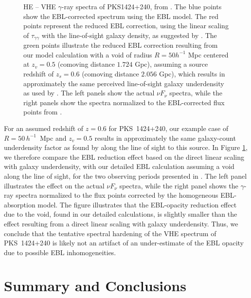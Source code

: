 \documentclass{aastex6}
\begin{document}
\begin{figure}[ht]
\caption{HE -- VHE $\gamma$-ray spectra of PKS1424+240, from \cite{Archambault14}. The blue points
show the EBL-corrected spectrum using the \cite{Gilmore12} EBL model. The red points represent the reduced
EBL correction, using the linear scaling of $\tau_{\gamma\gamma}$ with the line-of-sight galaxy density,
as suggested by \cite{Furniss15}. The green points illustrate the reduced EBL correction resulting from
our model calculation with a void of radius $R = 50h^{-1}$ Mpc centered at $z_v = 0.5$ (comoving distance 
$1.724$ Gpc), assuming a source redshift of $z_s = 0.6$ (comoving distance $2.056$ Gpc), which results in
approximately the same perceived line-of-sight galaxy underdensity as used by \cite{Furniss15}. The left
panels show the actual $\nu F_{\nu}$ spectra, while the right panels show the spectra normalized to the
EBL-corrected flux points from \cite{Archambault14}.
\label{fig:Furniss} }
\end{figure}

For an assumed redshift of $z = 0.6$ for PKS~1424+240, our example case of $R = 50 \, h^{-1}$~Mpc and $z_v = 0.5$ 
results in approximately the same galaxy-count underdensity factor as found by \cite{Furniss15} along the line of
sight to this source. In Figure \ref{fig:Furniss}, we therefore compare the EBL reduction effect based on
the direct linear scaling with galaxy underdensity, with our detailed EBL calculation assuming a void
along the line of sight, for the two observing periods presented in \cite{Archambault14}. The left panel
illustrates the effect on the actual $\nu F_{\nu}$ spectra, while the right panel shows the $\gamma$-ray
spectra normalized to the flux points corrected by the homogeneous \cite{Gilmore12} EBL-absorption model. 
The figure illustrates that the EBL-opacity reduction effect due to the void, found in our detailed
calculations, is slightly smaller than the effect resulting from a direct linear scaling with galaxy
underdensity. Thus, we conclude that the tentative spectral hardening of the VHE spectrum of PKS~1424+240 
is likely not an artifact of an under-estimate of the EBL opacity due to possible EBL inhomogeneities. 


\section{Summary and Conclusions}
\label{Summary}
\end{document}
